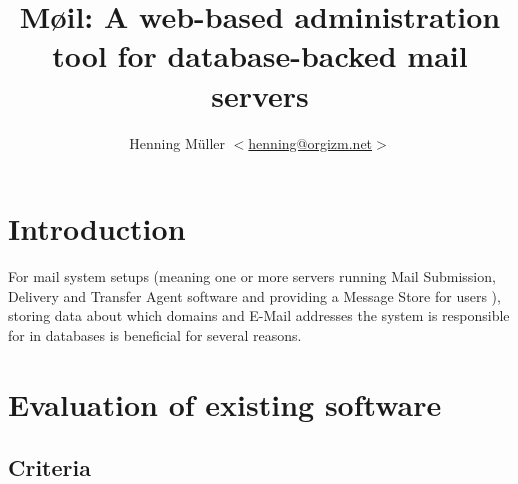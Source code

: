 \documentclass[12pt,a4paper]{scrartcl}
\begin{document}
	\title{Møil: A web-based administration tool for database-backed mail servers}
	\author{Henning Müller $<$\href{mailto:henning@orgizm.net}{henning@orgizm.net}$>$}
	\date{}

	\maketitle



	\section*{Introduction}
		For mail system setups (meaning one or more servers running Mail
		Submission, Delivery and Transfer Agent software and providing a
		Message Store for users \cite{mail-architecture}), storing data about
		which domains and E-Mail addresses the system is responsible for in
		databases is beneficial for several reasons.


	\section*{Evaluation of existing software}

		\subsection*{Criteria}
\end{document}
